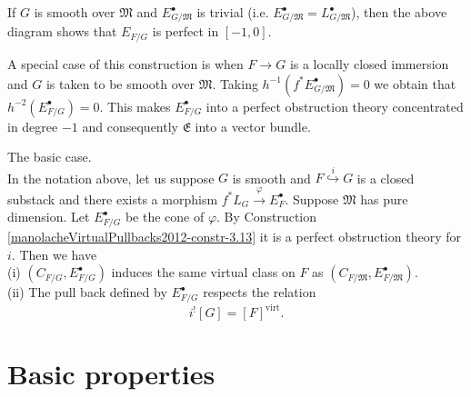 \begin{remark}\label{manolacheVirtualPullbacks2012-rem-3.15}
\label{manolacheVirtualPullbacks2012-smooth}
 If $G$ is smooth over $\mathfrak{M}$ and $E_{G/\mathfrak{M}}^{\bullet}$ is trivial (i.e. $E_{G/\mathfrak{M}}^{\bullet}=L_{G/\mathfrak{M}}^{\bullet}$), then the above diagram shows that $E_{F/G}$ is perfect in $[-1,0]$.
\end{remark}

\begin{example}\label{manolacheVirtualPullbacks2012-ex-3.16}
\label{manolacheVirtualPullbacks2012-easyfunct} A special case of this construction is when $F\to G$ is a locally closed immersion and $G$ is taken to be smooth over $\mathfrak{M}$. Taking $h^{-1}(f^*E_{G/\mathfrak{M}}^{\bullet})=0$ we obtain that $h^{-2}(E_{F/G}^{\bullet})=0$. This makes $E_{F/G}^{\bullet}$ into a perfect obstruction theory concentrated in degree $-1$ and consequently $\mathfrak{E}$ into a vector bundle.
\end{example}

\begin{example}\label{manolacheVirtualPullbacks2012-ex-3.17}
 The basic case.
\\In the notation above, let us suppose $G$ is smooth and $F\stackrel{i}{\hookrightarrow}G$ is a closed substack and there exists a morphism $f^*L_G\stackrel{\varphi}{\rightarrow}E_{F}^{\bullet}$. Suppose $\mathfrak{M}$ has pure dimension. Let $E_{F/G}^{\bullet}$ be the cone of $\varphi$. By Construction \ref{manolacheVirtualPullbacks2012-constr-3.13} it is a perfect obstruction theory for $i$. Then we have
\\(i) $(C_{F/G},E_{F/G}^{\bullet})$ induces the same virtual class on $F$ as $(C_{F/\mathfrak{M}},E_{F/\mathfrak{M}}^{\bullet})$.
\\(ii) The pull back defined by $E_{F/G}^{\bullet}$ respects the relation $$i^![G]=[F]^{\mathrm{virt}}.$$
\end{example}

\section{Basic properties}\label{manolacheVirtualPullbacks2012-sec-4}


